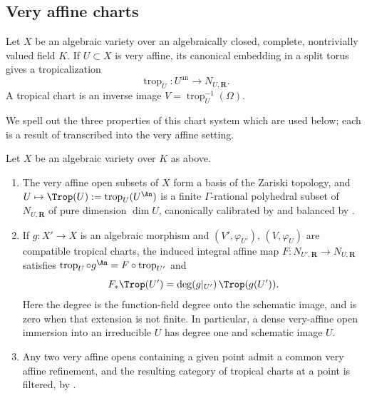 \subsection{Very affine charts}
\label{sec:ch18-very-affine}

Let $X$ be an algebraic variety over an algebraically closed, complete,
nontrivially valued field $K$.  If $U\subset X$ is very affine, its
canonical embedding in a split torus gives a tropicalization
\[
                      \operatorname{trop}_U:U^{\mathrm{an}}\to N_{U,\mathbf R}.
\]
A tropical chart is an inverse image $V=\operatorname{trop}_U^{-1}(\Omega)$.

We spell out the three properties of this chart system which are used below;
each is a result of  transcribed into the
very affine setting.

\begin{lemma}
\label{lem:ch18-very-affine-charts}
Let $X$ be an algebraic variety over $K$ as above.
\begin{enumerate}
\item\label{itm:ch18-va:cover}
 The very affine open subsets of $X$ form a basis of the Zariski topology,
 and $U\mapsto\Trop(U):=\operatorname{trop}_U(U^{\An})$ is a finite
 $\Gamma$-rational polyhedral subset of $N_{U,\mathbf R}$ of pure dimension
 $\dim U$, canonically calibrated by
  and balanced by
 .
\item\label{itm:ch18-va:refine}
 If $g:X'\to X$ is an algebraic morphism and
 $(V',\varphi_{U'})$, $(V,\varphi_U)$ are compatible tropical charts, the
 induced integral affine map
 $F:N_{U',\mathbf R}\to N_{U,\mathbf R}$ satisfies
 $\operatorname{trop}_U\circ g^{\An}=F\circ\operatorname{trop}_{U'}$ and
 \[
       F_*\Trop(U')=\deg(g|_{U'})\,\Trop(g(U')).
 \]
 Here the degree is the function-field degree onto the schematic image,
 and is zero when that extension is not finite.  In particular, a dense
 very-affine open immersion into an irreducible $U$ has degree one and
 schematic image $U$.
\item\label{itm:ch18-va:filtered}
 Any two very affine opens containing a given point admit a common very
 affine refinement, and the resulting category of tropical charts at a point
 is filtered, by .
\end{enumerate}
\end{lemma}

